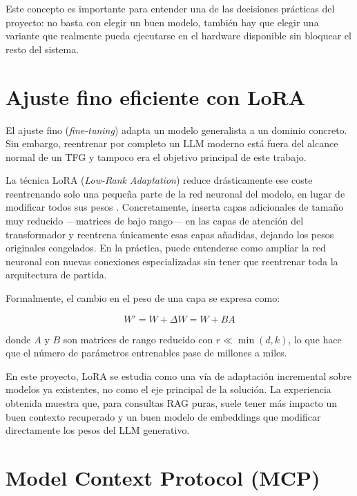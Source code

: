 Este concepto es importante para entender una de las decisiones prácticas del proyecto: no basta con elegir un buen modelo, también hay que elegir una variante que realmente pueda ejecutarse en el hardware disponible sin bloquear el resto del sistema.

\section{Ajuste fino eficiente con LoRA}
\label{sec:lora}

El ajuste fino (\textit{fine-tuning}) adapta un modelo generalista a un dominio concreto. Sin embargo, reentrenar por completo un LLM moderno está fuera del alcance normal de un TFG y tampoco era el objetivo principal de este trabajo.

La técnica LoRA (\textit{Low-Rank Adaptation}) reduce drásticamente ese coste reentrenando solo una pequeña parte de la red neuronal del modelo, en lugar de modificar todos sus pesos \cite{hu2021lora}. Concretamente, inserta capas adicionales de tamaño muy reducido —matrices de bajo rango— en las capas de atención del transformador y reentrena únicamente esas capas añadidas, dejando los pesos originales congelados. En la práctica, puede entenderse como ampliar la red neuronal con nuevas conexiones especializadas sin tener que reentrenar toda la arquitectura de partida.

Formalmente, el cambio en el peso de una capa se expresa como:

\begin{equation}
W' = W + \Delta W = W + BA
\end{equation}

donde $A$ y $B$ son matrices de rango reducido con $r \ll \min(d,k)$, lo que hace que el número de parámetros entrenables pase de millones a miles.

En este proyecto, LoRA se estudia como una vía de adaptación incremental sobre modelos ya existentes, no como el eje principal de la solución. La experiencia obtenida muestra que, para consultas RAG puras, suele tener más impacto un buen contexto recuperado y un buen modelo de embeddings que modificar directamente los pesos del LLM generativo.

\section{Model Context Protocol (MCP)}

